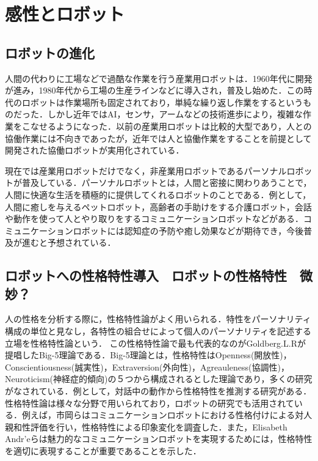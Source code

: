 \newpage

\section{感性とロボット}
\label{sec2.3}

\subsection{ロボットの進化}
\label{sec2.3.1}
人間の代わりに工場などで過酷な作業を行う産業用ロボットは．1960年代に開発が進み，1980年代から工場の生産ラインなどに導入され，普及し始めた．この時代のロボットは作業場所も固定されており，単純な繰り返し作業をするというものだった．しかし近年ではAI，センサ，アームなどの技術進歩により，複雑な作業をこなせるようになった．以前の産業用ロボットは比較的大型であり，人との協働作業には不向きであったが，近年では人と協働作業をすることを前提として開発された協働ロボットが実用化されている．

現在では産業用ロボットだけでなく，非産業用ロボットであるパーソナルロボットが普及している．パーソナルロボットとは，人間と密接に関わりあうことで，人間に快適な生活を積極的に提供してくれるロボットのことである．例として，人間に癒しを与えるペットロボット，高齢者の手助けをする介護ロボット，会話や動作を使って人とやり取りをするコミュニケーションロボットなどがある．コミュニケーションロボットには認知症の予防や癒し効果などが期待でき，今後普及が進むと予想されている．


\subsection{ロボットへの性格特性導入　ロボットの性格特性　微妙？}
\label{sec2.3.2}

人の性格を分析する際に，性格特性論がよく用いられる．特性をパーソナリティ構成の単位と見なし，各特性の組合せによって個人のパーソナリティを記述する立場を性格特性論という\cite{性格特性論}．
この性格特性論で最も代表的なのがGoldberg.L.Rが提唱したBig-5理論である．Big-5理論とは，性格特性はOpenness(開放性)，Conscientiousness(誠実性)，Extraversion(外向性)，Agreauleness(協調性)，Neuroticism(神経症的傾向)の５つから構成されるとした理論であり，多くの研究がなされている．例として，対話中の動作から性格特性を推測する研究がある\cite{性格特性推測}．性格特性論は様々な分野で用いられており，ロボットの研究でも活用されている．例えば，市岡らはコミュニケーションロボットにおける性格付けによる対人親和性評価を行い，性格特性による印象変化を調査した\cite{対人親和性}．また，Elisabeth Andr'eらは魅力的なコミュニケーションロボットを実現するためには，性格特性を適切に表現することが重要であることを示した\cite{ロボットの性格特性1}\cite{ロボットの性格特性2}\cite{ロボットの性格特性3}．


